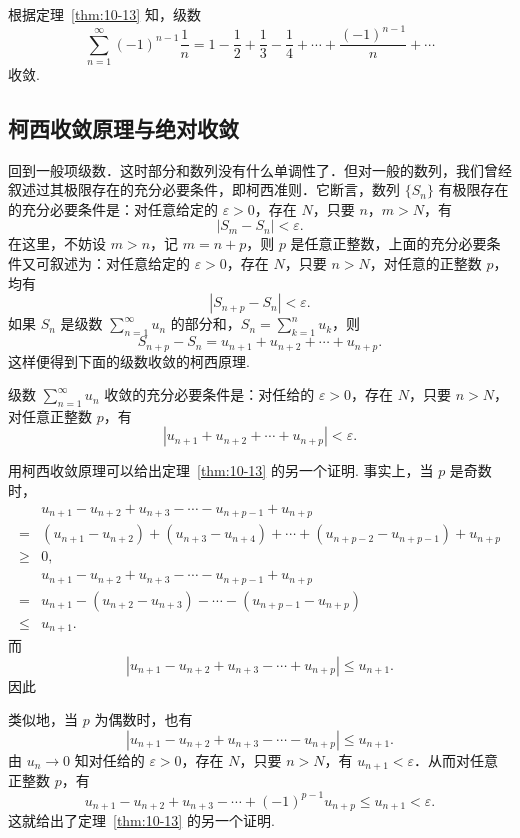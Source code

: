 根据定理~\ref{thm:10-13} 知，级数
\[
\sum_{n=1}^{\infty}(-1)^{n-1}\frac{1}{n}=1-\frac{1}{2}+\frac{1}{3}-\frac{1}{4}+\cdots+\frac{(-1)^{n-1}}{n}+\cdots
\]
收敛.

\subsection{柯西收敛原理与绝对收敛}

回到一般项级数．这时部分和数列没有什么单调性了．但对一般的数列，我们曾经叙述过其极限存在的充分必要条件，即柯西准则．它断言，数列 $\{S_{n}\}$ 有极限存在的充分必要条件是：对任意给定的 $\varepsilon>0$，存在 $N$，只要 $n$，$m>N$，有
\[
|S_{m}-S_{n}|<\varepsilon.
\]
在这里，不妨设 $m>n$，记 $m=n+p$，则 $p$ 是任意正整数，上面的充分必要条件又可叙述为：对任意给定的 $\varepsilon>0$，存在 $N$，只要 $n>N$，对任意的正整数 $p$，均有
\[
|S_{n+p}-S_{n}|<\varepsilon.
\]
如果 $S_{n}$ 是级数 $\sum_{n=1}^{\infty}u_{n}$ 的部分和，$S_{n}=\sum_{k=1}^{n}u_{k}$，则
\[
S_{n+p}-S_{n}=u_{n+1}+u_{n+2}+\cdots+u_{n+p}.
\]
这样便得到下面的级数收敛的柯西原理.

\begin{theorem}[柯西收敛原理]\label{thm:10-14}
级数 $\sum_{n=1}^{\infty}u_n$ 收敛的充分必要条件是：对任给的 $\varepsilon>0$，存在 $N$，只要 $n>N$，对任意正整数 $p$，有
\[
|u_{n+1}+u_{n+2}+\cdots+u_{n+p}|<\varepsilon.
\]
\end{theorem}

用柯西收敛原理可以给出定理~\ref{thm:10-13} 的另一个证明. 事实上，当 $p$ 是奇数时，
\[
\begin{aligned}
&u_{n+1}-u_{n+2}+u_{n+3}-\cdots-u_{n+p-1}+u_{n+p}\\
={}&(u_{n+1}-u_{n+2})+(u_{n+3}-u_{n+4})+\cdots+(u_{n+p-2}-u_{n+p-1})+u_{n+p}\\
\geqslant{}&0,\\
&u_{n+1}-u_{n+2}+u_{n+3}-\cdots-u_{n+p-1}+u_{n+p}\\
={}&u_{n+1}-(u_{n+2}-u_{n+3})-\cdots-(u_{n+p-1}-u_{n+p})\\
\leqslant{}&u_{n+1}.
\end{aligned}
\]
而
\[
|u_{n+1}-u_{n+2}+u_{n+3}-\cdots+u_{n+p}|\leqslant u_{n+1}.
\]
因此

类似地，当 $p$ 为偶数时，也有
\[
|u_{n+1}-u_{n+2}+u_{n+3}-\cdots-u_{n+p}|\leqslant u_{n+1}.
\]
由 $u_n \to 0$ 知对任给的 $\varepsilon>0$，存在 $N$，只要 $n>N$，有 $u_{n+1}<\varepsilon$．从而对任意正整数 $p$，有
\[
u_{n+1}-u_{n+2}+u_{n+3}-\cdots+(-1)^{p-1}u_{n+p}\leqslant u_{n+1}<\varepsilon.
\]
这就给出了定理~\ref{thm:10-13} 的另一个证明.

